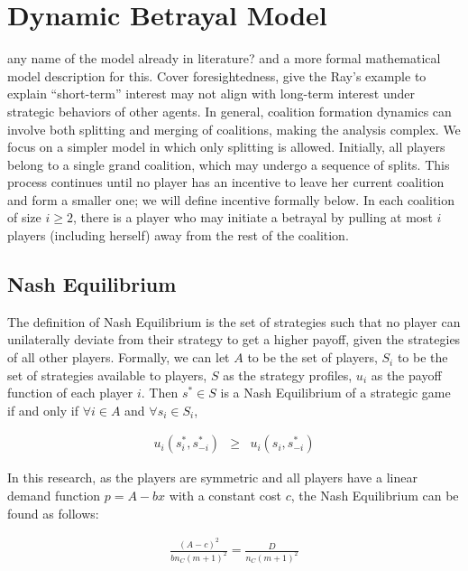 \documentclass[sigconf,anonymous]{aamas}
\newcommand{\ykc}[1]{{\color{blue} #1}}
\begin{document}
\section{Dynamic Betrayal Model}

\ykc{any name of the model already in literature? and a more formal mathematical model description for this. Cover foresightedness, give the Ray's example to explain ``short-term'' interest may not align with long-term interest under strategic behaviors of other agents.}
In general, coalition formation dynamics can involve both splitting and merging of coalitions, making the analysis complex. We focus on a simpler model in which only splitting is allowed. Initially, all players belong to a single grand coalition, which may undergo a sequence of splits. This process continues until no player has an incentive to leave her current coalition and form a smaller one; we will define incentive formally below. In each coalition of size $i \geq 2$, there is a player who may initiate a betrayal by pulling at most $i$ players (including herself) away from the rest of the coalition.


\subsection{Nash Equilibrium}

The definition of Nash Equilibrium is the set of strategies such that no player can unilaterally deviate from their strategy to get a higher payoff, given the strategies of all other players. Formally, we can let $A$ to be the set of players, $S_i$ to be the set of strategies available to players, $S$ as the strategy profiles, $u_i$ as the payoff function of each player $i$. Then $s^*\in S$ is a Nash Equilibrium of a strategic game if and only if $\forall i \in A$ and $\forall s_i \in S_i$, 

\begin{eqnarray}
u_i(s^*_i, s_{-i}^*) & \geq & u_i(s_i, s_{-i}^*)
\end{eqnarray} 

In this research, as the players are symmetric and all players have a linear demand function $p = A - bx$ with a constant cost $c$, the Nash Equilibrium can be found as follows: 

\begin{eqnarray}
	\frac{(A-c)^2}{bn_C(m+1)^2} = \frac{D}{n_C(m+1)^2}
\end{eqnarray}
\end{document}
